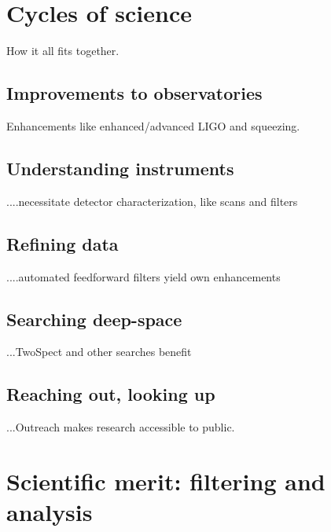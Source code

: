 


 
    \section{Cycles of science}
    \label{cycles}

        How it all fits together.

        \subsection{Improvements to observatories}
        \label{observatories_better}

            Enhancements like enhanced/advanced LIGO and squeezing.

        \subsection{Understanding instruments}
        \label{instrumental_understanding}

            ....necessitate detector characterization, like scans and filters

        \subsection{Refining data}
        \label{data_refinements}

            ....automated feedforward filters yield own enhancements

        \subsection{Searching deep-space}
        \label{searching_space}

            ...TwoSpect and other searches benefit

        \subsection{Reaching out, looking up}
        \label{reaching_out}

            ...Outreach makes research accessible to public.

    \section{Scientific merit: filtering and analysis}
    \label{merit}

